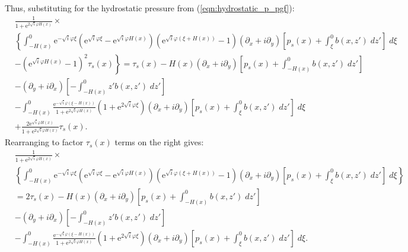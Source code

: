 \documentclass[10pt]{amsart}
\begin{document}
Thus, substituting for the hydrostatic pressure from (\ref{eqn:hydrostatic_p_pgf}):
 \begin{align}
& \frac{1}{{ 1 + \mathrm{e}^{2 \sqrt{i} \varphi H(x )} } } \times \nonumber \\
& \left\{
 \int_{-H(x)}^{0} 
\mathrm{e}^{-\sqrt{i} \varphi \xi} 
\left(
\mathrm{e}^{\sqrt{i} \varphi \xi} - 
\mathrm{e}^{\sqrt{i} \varphi H(x)} 
\right) \left(
\mathrm{e}^{\sqrt{i} \varphi  \left( \xi + H(x) \right)} - 1
\right)
 \left( \partial_x  + i \partial_y  \right)
\left[
 p_s (x) + \int_{\xi}^{0} b(x,z') \; dz'  \right]
 \; d \xi   \right. \nonumber \\
& - \left.
\left( 
\mathrm{e}^{\sqrt{i} \varphi  H(x) }   - 1   
\right)^2
\tau_s (x)  \right\} 
 = \tau_s (x) - H(x) \left( \partial_x  + i \partial_y  \right)
\left[ 
p_s(x) + \int_{-H(x)}^{0} b(x,z') \; dz'
\right] \nonumber \\
& -  \left( \partial_y  + i \partial_x  \right)
\left[
 - \int_{-H(x)}^0 z' b(x,z') \; dz'
 \right] \nonumber \\
&- 
\int_{-H(x)}^{0} 
\frac{ \mathrm{e}^{-\sqrt{i} \varphi (\xi - H(x))  } }{ 1 + \mathrm{e}^{2 \sqrt{i} \varphi H \left(x \right)} }
\left( 1 + \mathrm{e}^{2 \sqrt{i} \varphi \xi}\right) 
  \left( \partial_x  + i \partial_y  \right)
\left[
 p_s (x) + \int_{\xi}^{0} b(x,z') \; dz'  \right]
 \; d \xi \nonumber \\
& +
\frac{ 2 \mathrm{e}^{\sqrt{i} \varphi H(x)  } }{ 1 + \mathrm{e}^{2 \sqrt{i} \varphi H \left(x \right)} }
\tau_s (x)
. \nonumber
\end{align}
Rearranging to factor $\tau_s (x)$ terms on the right gives:
 \begin{align}
& \frac{1}{{1 + \mathrm{e}^{2 \sqrt{i} \varphi H(x )} } } \times \nonumber \\
& \left\{
 \int_{-H(x)}^{0} 
\mathrm{e}^{-\sqrt{i} \varphi \xi} 
\left(
\mathrm{e}^{\sqrt{i} \varphi \xi} - 
\mathrm{e}^{\sqrt{i} \varphi H(x)} 
\right) \left(
\mathrm{e}^{\sqrt{i} \varphi  \left( \xi + H(x) \right)} - 1
\right)
 \left( \partial_x  + i \partial_y  \right)
\left[
 p_s (x) + \int_{\xi}^{0} b(x,z') \; dz'  \right]
 \; d \xi   \right\} \nonumber \\
& = 2 \tau_s (x) 
 - H(x) \left( \partial_x + i \partial_y  \right)
\left[ 
p_s(x) + \int_{-H(x)}^{0} b(x,z') \; dz'
\right] \nonumber \\
& -  \left( \partial_y  + i \partial_x  \right)
\left[
 - \int_{-H(x)}^0 z' b(x,z') \; dz'
 \right] \nonumber \\
&- 
\int_{-H(x)}^{0} 
\frac{ \mathrm{e}^{-\sqrt{i} \varphi (\xi - H(x))  } }{ 1 + \mathrm{e}^{2 \sqrt{i} \varphi H \left(x \right)} }
\left( 1 + \mathrm{e}^{2 \sqrt{i} \varphi \xi}\right) 
  \left( \partial_x  + i \partial_y  \right)
\left[
 p_s (x) + \int_{\xi}^{0} b(x,z') \; dz'  \right]
 \; d \xi 
. \nonumber
\end{align}
\end{document}
